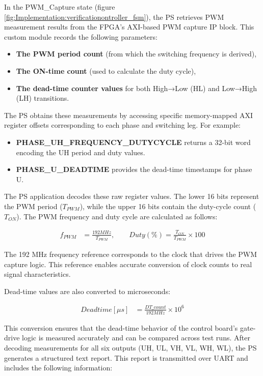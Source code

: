 In the \acs{PWM}\_Capture state (figure \ref{fig:Implementation:verificationontroller_fsm}), the \acs{PS} retrieves \acs{PWM} measurement results from the \acs{FPGA}’s \acs{AXI}-based \acs{PWM} capture \acs{IP} block. This custom module records the following parameters:

\begin{itemize}
	\item \textbf{The \acs{PWM} period count} (from which the switching frequency is derived),
	\item \textbf{The ON-time count} (used to calculate the duty cycle),
	\item \textbf{The dead-time counter values} for both High→Low (HL) and Low→High (LH) transitions.
\end{itemize}

The \acs{PS} obtains these measurements by accessing specific memory-mapped \acs{AXI} register offsets corresponding to each phase and switching leg. For example:

\begin{itemize}
	\item \textbf{PHASE\_UH\_FREQUENCY\_DUTYCYCLE} returns a 32-bit word encoding the UH period and duty values.
	\item \textbf{PHASE\_U\_DEADTIME} provides the dead-time timestamps for phase U.
\end{itemize}

The \acs{PS} application decodes these raw register values. The lower 16 bits represent the \acs{PWM} period ($T_{PWM}$), while the upper 16 bits contain the duty-cycle count ($T_{ON}$). The \acs{PWM} frequency and duty cycle are calculated as follows:

\begin{align*}
	f_{PWM} &= \frac{192 MHz}{T_{PWM}}, \qquad Duty(\%) = \frac{T_{ON}}{T_{PWM}} \times 100
\end{align*}

The 192 MHz frequency reference corresponds to the clock that drives the PWM capture logic. This reference enables accurate conversion of clock counts to real signal characteristics.

Dead-time values are also converted to microseconds:

\begin{align*}
	Deadtime[\mu s] &= \frac{DT\_count}{192 MHz} \times 10^6
\end{align*}

This conversion ensures that the dead-time behavior of the control board’s gate-drive logic is measured accurately and can be compared across test runs. After decoding measurements for all six outputs (UH, UL, VH, VL, WH, WL), the \acs{PS} generates a structured text report. This report is transmitted over \acs{UART} and includes the following information:

